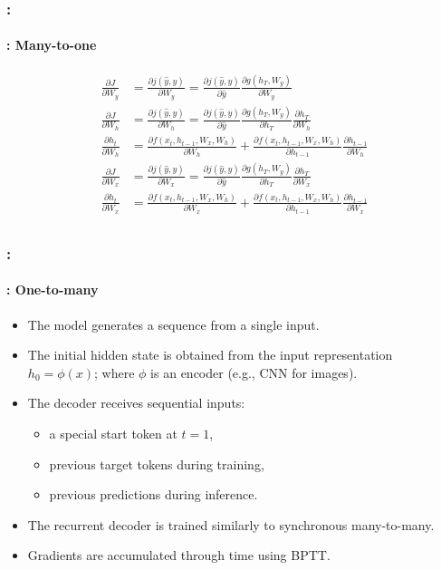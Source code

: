 \documentclass[xcolor=table]{beamer}
\begin{document}
\begin{frame}
	\frametitle{\insertshortsubtitle: \insertsection}
	\framesubtitle{\insertsubsection: Many-to-one}
	
	\begin{align*}
		\frac{\partial J}{\partial W_y} & = \frac{\partial j(\hat{y}, y)}{\partial W_y}
		= \frac{\partial j(\hat{y}, y)}{\partial \hat{y}} \frac{\partial g(h_T, W_y)}{\partial W_y} \\
		\frac{\partial J}{\partial W_h} & = \frac{\partial j(\hat{y}, y)}{\partial W_h}
		= \frac{\partial j(\hat{y}, y)}{\partial \hat{y}} 
		\frac{\partial g(h_T, W_y)}{\partial h_T} 
		\frac{\partial h_T}{\partial W_h} \\
		\frac{\partial h_t}{\partial W_h} & = 
		\frac{\partial f(x_t, h_{t-1}, W_x, W_h)}{\partial W_h} + 
		\frac{\partial f(x_t, h_{t-1}, W_x, W_h)}{\partial h_{t-1}} \frac{\partial h_{t-1}}{\partial W_h} \\
		\frac{\partial J}{\partial W_x} & = \frac{\partial j(\hat{y}, y)}{\partial W_x}
		= \frac{\partial j(\hat{y}, y)}{\partial \hat{y}} 
		\frac{\partial g(h_T, W_y)}{\partial h_T} 
		\frac{\partial h_T}{\partial W_x} \\
		\frac{\partial h_t}{\partial W_x} & = 
		\frac{\partial f(x_t, h_{t-1}, W_x, W_h)}{\partial W_x} + 
		\frac{\partial f(x_t, h_{t-1}, W_x, W_h)}{\partial h_{t-1}} \frac{\partial h_{t-1}}{\partial W_x} \\
	\end{align*}
	
\end{frame}

\begin{frame}
	\frametitle{\insertshortsubtitle: \insertsection}
	\framesubtitle{\insertsubsection: One-to-many}
	
	\begin{itemize}
		
		\item The model generates a sequence from a single input.
		
		\item The initial hidden state is obtained from the input representation $h_0 = \phi(x)$;
		where $\phi$ is an encoder (e.g., CNN for images).
		
		\item The decoder receives sequential inputs:
		\begin{itemize}
			\item a special start token at $t=1$,
			\item previous target tokens during training,
			\item previous predictions during inference.
		\end{itemize}
		
		\item The recurrent decoder is trained similarly to synchronous many-to-many.
		
		\item Gradients are accumulated through time using BPTT.
		
	\end{itemize}
	
\end{frame}
\end{document}
